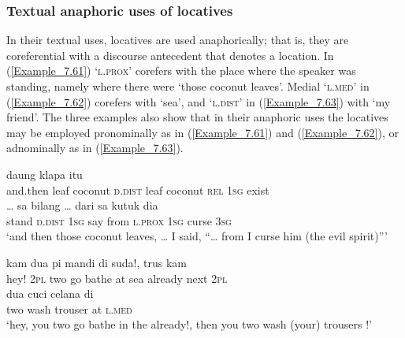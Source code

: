 {\subsubsection[Textual anaphoric uses of locatives]{Textual anaphoric uses of locatives}
\label{Para_7.2.2.5}
In their textual uses, locatives are used anaphorically; that is, they are coreferen\-tial with a discourse antecedent that denotes a location. In (\ref{Example_7.61})  ‘\textsc{l.prox}’ corefers with the place where the speaker was standing, namely where there were  ‘those coconut leaves’. Medial  ‘\textsc{l.med}’ in (\ref{Example_7.62}) corefers with  ‘sea’, and  ‘\textsc{l.dist}’ in (\ref{Example_7.63}) with  ‘my friend’. The three examples also show that in their anaphoric uses the locatives may be employed pronominally as in (\ref{Example_7.61}) and (\ref{Example_7.62}), or adnominally as in (\ref{Example_7.63}).

\ea
\label{Example_7.61}
 {{daung}} {{klapa}} {itu} {{}} {{}} {{}} {{}} {{}}\\ %
 {and.then}  {leaf}  {coconut}  \textsc{d.dist}  {leaf}  {coconut}  {\textsc{rel}}  {\textsc{1sg}}  {exist}\\
\gll {}  {}  {\ldots}  sa  {bilang}  {\ldots}  {dari}  {}  {sa}  {kutuk}  dia\\
 stand  {\textsc{d.dist}}  {}  \textsc{1sg}  {say} {}   {from}  {\textsc{l.prox}}  {\textsc{1sg}}  {curse}  \textsc{3sg}\\
\glt 
‘and then those coconut leaves,  {\ldots} I said, ``{\ldots} from  I curse him (the evil spirit)''' \textstyleExampleSource{[080917-008-NP.0101/0103]}
\z

\ea
\label{Example_7.62}
 {kam} {dua} {{pi}} {{mandi}} {di} {} {suda!,} {trus} {kam}\\ %
 {hey!}  \textsc{2pl}  two  {go}  {bathe}  at  sea  already  next  \textsc{2pl}\\
\gll dua  {cuci}  {celana}  {di}  {}\\
 two  {wash}  {trouser}  {at}  {\textsc{l.med}}\\
 ‘hey, you two go bathe in the  already!, then you two wash (your) trousers !’ \textstyleExampleSource{[080917-006-CvHt.0007]}
\z


}
